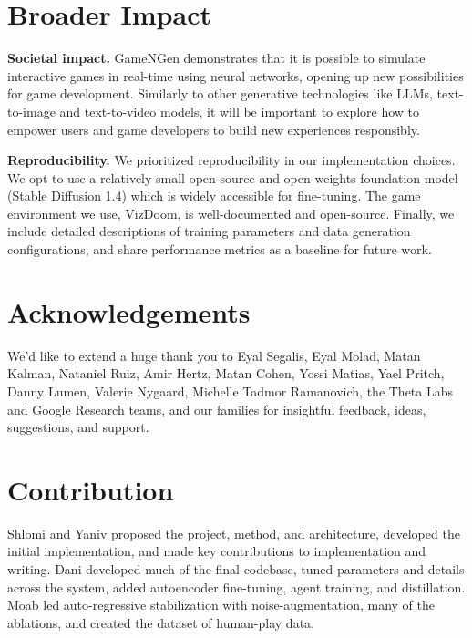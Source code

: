 \documentclass{article} %
\begin{document}
\section*{Broader Impact}
\textbf{Societal impact.} GameNGen demonstrates that it is possible to simulate interactive games in real-time using neural networks, opening up new possibilities for game development. Similarly to other generative technologies like LLMs, text-to-image and text-to-video models, it will be important to explore how to empower users and game developers to build new experiences responsibly.

\textbf{Reproducibility.} We prioritized reproducibility in our implementation choices. We opt to use a relatively small open-source and open-weights foundation model (Stable Diffusion 1.4) which is widely accessible for fine-tuning. The game environment we use, VizDoom, is well-documented and open-source. Finally, we include detailed descriptions of training parameters and data generation configurations, and share performance metrics as a baseline for future work.

\section*{Acknowledgements}

We'd like to extend a huge thank you to Eyal Segalis, Eyal Molad, Matan Kalman, Nataniel Ruiz, Amir Hertz, Matan Cohen, Yossi Matias, Yael Pritch, Danny Lumen, Valerie Nygaard, Michelle Tadmor Ramanovich, the Theta Labs and Google Research teams, and our families for insightful feedback, ideas, suggestions, and support.

\section*{Contribution}
Shlomi and Yaniv proposed the project, method, and architecture, developed the initial implementation, and made key contributions to implementation and writing. Dani developed much of the final codebase, tuned parameters and details across the system, added autoencoder fine-tuning, agent training, and distillation. Moab led auto-regressive stabilization with noise-augmentation, many of the ablations, and created the dataset of human-play data.




\clearpage

\newpage
\end{document}
